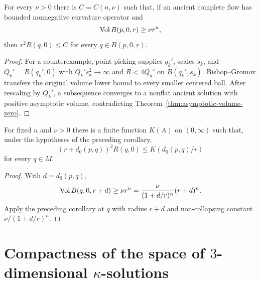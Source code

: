 \begin{corollary}\label{cor:volume-bound-implies-curvature-bound}
\label{bdvolbdcurv}

For every $\nu>0$ there is $C=C(n,\nu)$ such that, if an ancient
complete flow has bounded nonnegative curvature operator and
\[
 \operatorname{Vol} B(p,0,r)\geq\nu r^n,
\]
then $r^2R(q,0)\leq C$ for every $q\in B(p,0,r)$.
\end{corollary}
\begin{proof}
\sketch
{}
For a counterexample, point-picking supplies $q_k'$, scales $s_k$,
and $Q_k'=R(q_k',0)$ with $Q_k's_k^2\to\infty$ and
$R<4Q_k'$ on $B(q_k',s_k)$. Bishop--Gromov transfers the original
volume lower bound to every smaller centered ball. After rescaling
by $Q_k'$, a subsequence converges to a nonflat ancient solution
with positive asymptotic volume, contradicting
Theorem~\ref{thm:asymptotic-volume-zero}.
\end{proof}

\begin{corollary}\label{cor:global-curvature-bound-from-volume}
\label{global}

For fixed $n$ and $\nu>0$ there is a finite function $K(A)$ on
$(0,\infty)$ such that, under the hypotheses of the preceding
corollary,
\[
 (r+d_0(p,q))^2R(q,0)
 \leq K(d_0(p,q)/r)
\]
for every $q\in M$.
\end{corollary}
\begin{proof}
\sketch
{}
With $d=d_0(p,q)$,
\[
 \operatorname{Vol} B(q,0,r+d)\geq\nu r^n
 =\frac{\nu}{(1+d/r)^n}(r+d)^n.
\]
Apply the preceding corollary at $q$ with radius $r+d$ and
non-collapsing constant $\nu/(1+d/r)^n$.
\end{proof}

\section{Compactness of the space of $3$-dimensional
$\kappa$-solutions}

